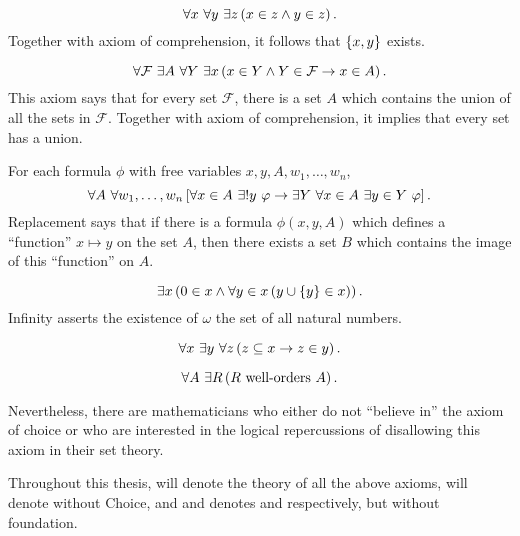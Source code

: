 \begin{axiom}[Pairing]
    \[\forall x\ \forall y\ \exists z\left(x\in z\land y\in z\right).\]
    Together with axiom of comprehension, it follows that \({\left\{ x,y \right\}}\) exists.
\end{axiom}

\begin{axiom}[Union]
    \[\forall\mathcal{F}\ \exists A\ \forall Y\ \exists x\left(x\in Y\land Y\in\mathcal{F}\to x\in A\right). \]
    This axiom says that for every set \(\mathcal{F}\), there is a set \(A\) which contains the union of all the sets in \(\mathcal{F}\).
    Together with axiom of comprehension, it implies that every set has a union.
\end{axiom}

\begin{axiom}
    For each formula \(\phi\) with free variables \(x,y,A,w_1,\dots,w_n\), \[ \forall A\ \forall w_1,\dots,w_n \sq{\forall x\in A\ \exists! y\ \phi \to \exists Y\ \forall x\in A\ \exists y\in Y\ \phi} .\]
    Replacement says that if there is a formula \(\phi(x,y,A)\) which defines a ``function'' \(x\mapsto y\) on the set \(A\),
    then there exists a set \(B\) which contains the image of this ``function'' on \(A\).
\end{axiom}

\begin{axiom}[Infinity]
    \[\exists x\left(0\in x\land \forall y\in x\left(y\cup{\left\{ y \right\}} \in x\right)\right). \]
    Infinity asserts the existence of \(\omega\) the set of all natural numbers.
\end{axiom}

\begin{axiom}
    \[\forall x\ \exists y\ \forall z\left(z\subseteq x\to z\in y\right).\]
\end{axiom}

\begin{axiom}[Choice]
    \[ \forall A\ \exists R \left(R \text{ well-orders } A\right). \]
\end{axiom}

Nevertheless, there are mathematicians who either do not ``believe in'' the axiom of choice or who are interested in the logical repercussions of disallowing this axiom in their set theory.

Throughout this thesis, \ZFC will denote the theory of all the above axioms, \ZF will denote \ZFC without Choice,
and \ZFCminus and \ZFminus denotes \ZFC and \ZF respectively, but without foundation.

